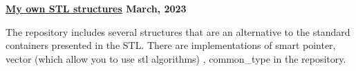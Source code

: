 \textbf{\href{https://github.com/jirol9xa/MySTL} {My own STL structures} \hfill  March, 2023} \par
\begin{itemize}
The repository includes several structures that are an alternative to the standard containers presented in the STL. There are implementations of smart pointer, vector (which allow you to use stl algorithms) , common\_type   in the repository.
\end{itemize} \par